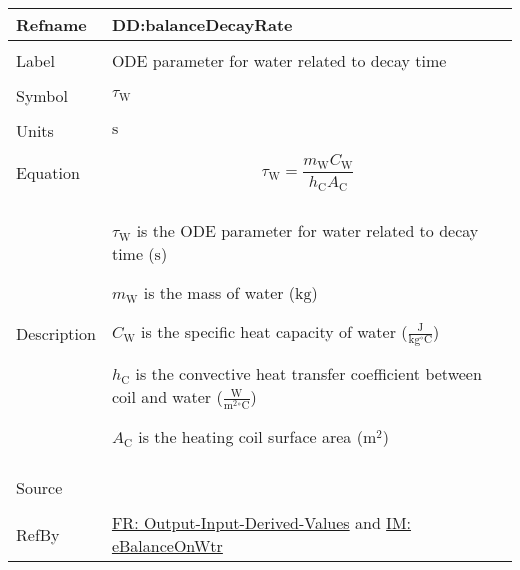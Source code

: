 \documentclass[12pt]{article}
\begin{document}
\vspace{\baselineskip}
\noindent
\begin{minipage}{\textwidth}
\begin{tabular}{>{\raggedright}p{}>{\raggedright\arraybackslash}p{}}
\toprule \textbf{Refname} & \textbf{DD:balanceDecayRate}
\label{DD:balanceDecayRate}
\\ \midrule \\
Label & ODE parameter for water related to decay time
        
\\ \midrule \\
Symbol & ${τ_{\text{W}}}$
         
\\ \midrule \\
Units & ${\text{s}}$
        
\\ \midrule \\
Equation & \begin{displaymath}
           {τ_{\text{W}}}=\frac{{m_{\text{W}}} {C_{\text{W}}}}{{h_{\text{C}}} {A_{\text{C}}}}
           \end{displaymath}
\\ \midrule \\
Description & \begin{symbDescription}
              \item{${τ_{\text{W}}}$ is the ODE parameter for water related to decay time (${\text{s}}$)}
              \item{${m_{\text{W}}}$ is the mass of water (${\text{kg}}$)}
              \item{${C_{\text{W}}}$ is the specific heat capacity of water ($\frac{\text{J}}{\text{kg}{}^{\circ}\text{C}}$)}
              \item{${h_{\text{C}}}$ is the convective heat transfer coefficient between coil and water ($\frac{\text{W}}{\text{m}^{2}{}^{\circ}\text{C}}$)}
              \item{${A_{\text{C}}}$ is the heating coil surface area (${\text{m}^{2}}$)}
              \end{symbDescription}
\\ \midrule \\
Source & \cite{koothoor2013}
         
\\ \midrule \\
RefBy & \hyperref[outputInputDerivVals]{FR: Output-Input-Derived-Values} and \hyperref[IM:eBalanceOnWtr]{IM: eBalanceOnWtr}
        
\\ \bottomrule
\end{tabular}
\end{minipage}
\end{document}
